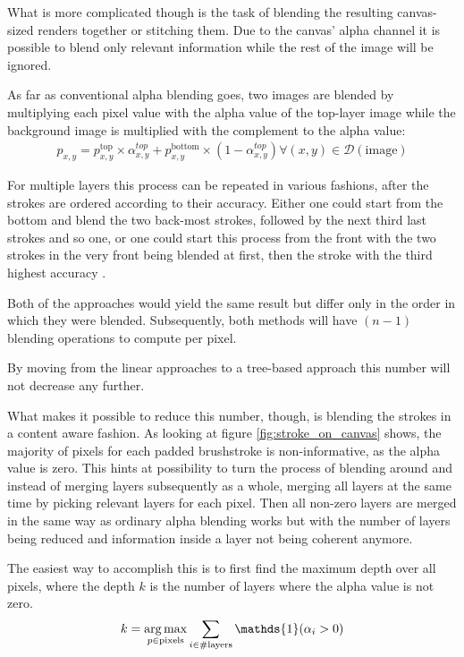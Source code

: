 What is more complicated though is the task of blending the resulting canvas-sized renders together or stitching them.
Due to the canvas' alpha channel it is possible to blend only relevant information while the rest of the image will be ignored.

As far as conventional alpha blending goes, two images are blended by multiplying each pixel value with the alpha value of the top-layer image while the background image is multiplied with the complement to the alpha value:
\begin{align}
    p_{x,y} = p^{\text{top}}_{x, y} \times \alpha^{top}_{x, y}
    + p^{\text{bottom}}_{x, y} \times (1 - \alpha^{top}_{x, y})
    \forall (x, y) \in \mathcal{D}(\text{image})
\end{align}

For multiple layers this process can be repeated in various fashions, after the strokes are ordered according to their accuracy.
Either one could start from the bottom and blend the two back-most strokes, followed by the next third last strokes and so one, or one could start this process from the front with the two strokes in the very front being blended at first, then the stroke with the third highest accuracy \etc.

Both of the approaches would yield the same result but differ only in the order in which they were blended.
Subsequently, both methods will have $(n-1)$ blending operations to compute per pixel.

By moving from the linear approaches to a tree-based approach this number will not decrease any further.

What makes it possible to reduce this number, though, is blending the strokes in  a content aware fashion.
As looking at figure \ref{fig:stroke_on_canvas} shows, the majority of pixels for each padded brushstroke is non-informative, as the alpha value is zero.
This hints at possibility to turn the process of blending around and instead of merging layers subsequently as a whole, merging all layers at the same time by picking relevant layers for each pixel.
Then all non-zero layers are merged in the same way as ordinary alpha blending works but with the number of layers being reduced and information inside a layer not being coherent anymore.


The easiest way to accomplish this is to first find the maximum depth over all pixels, where the depth $k$ is the number of layers where the alpha value is not zero.
\begin{align}
    k = \argmax_{p \in \text{pixels}} \sum_{i \in \# \text{layers}} \mathds{1}(\alpha_i > 0)
\end{align}

